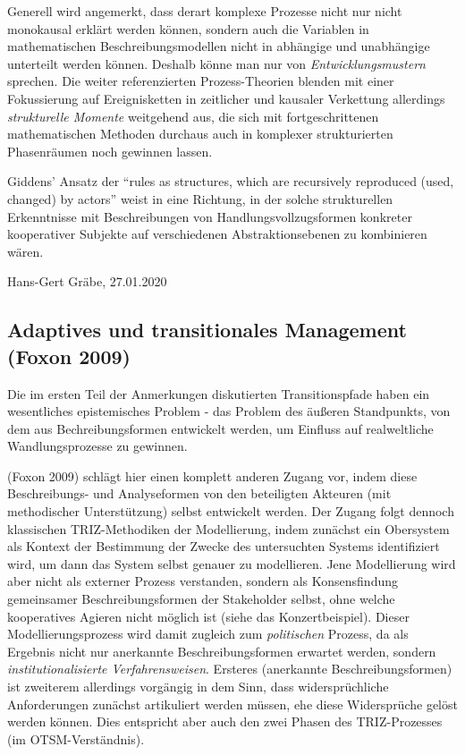 \documentclass[11pt,a4paper]{article}
\begin{document}
Generell wird angemerkt, dass derart komplexe Prozesse nicht nur nicht
monokausal erklärt werden können, sondern auch die Variablen in
mathematischen Beschreibungsmodellen nicht in abhängige und unabhängige
unterteilt werden können. Deshalb könne man nur von
\emph{Entwicklungsmustern} sprechen. Die weiter referenzierten
Prozess-Theorien blenden mit einer Fokussierung auf Ereignisketten in
zeitlicher und kausaler Verkettung allerdings \emph{strukturelle
Momente} weitgehend aus, die sich mit fortgeschrittenen mathematischen
Methoden durchaus auch in komplexer strukturierten Phasenräumen noch
gewinnen lassen.

Giddens' Ansatz der ``rules as structures, which are recursively
reproduced (used, changed) by actors'' weist in eine Richtung, in der
solche strukturellen Erkenntnisse mit Beschreibungen von
Handlungsvollzugsformen konkreter kooperativer Subjekte auf
verschiedenen Abstraktionsebenen zu kombinieren wären.

Hans-Gert Gräbe, 27.01.2020

\hypertarget{adaptives-und-transitionales-management-foxon-2009}{%
\subsection{Adaptives und transitionales Management (Foxon
2009)}\label{adaptives-und-transitionales-management-foxon-2009}}

Die im ersten Teil der Anmerkungen diskutierten Transitionspfade haben
ein wesentliches epistemisches Problem - das Problem des äußeren
Standpunkts, von dem aus Bechreibungsformen entwickelt werden, um
Einfluss auf realweltliche Wandlungsprozesse zu gewinnen.

(Foxon 2009) schlägt hier einen komplett anderen Zugang vor, indem diese
Beschreibungs- und Analyseformen von den beteiligten Akteuren (mit
methodischer Unterstützung) selbst entwickelt werden. Der Zugang folgt
dennoch klassischen TRIZ-Methodiken der Modellierung, indem zunächst ein
Obersystem als Kontext der Bestimmung der Zwecke des untersuchten
Systems identifiziert wird, um dann das System selbst genauer zu
modellieren. Jene Modellierung wird aber nicht als externer Prozess
verstanden, sondern als Konsensfindung gemeinsamer Beschreibungsformen
der Stakeholder selbst, ohne welche kooperatives Agieren nicht möglich
ist (siehe das Konzertbeispiel). Dieser Modellierungsprozess wird damit
zugleich zum \emph{politischen} Prozess, da als Ergebnis nicht nur
anerkannte Beschreibungsformen erwartet werden, sondern
\emph{institutionalisierte Verfahrensweisen}. Ersteres (anerkannte
Beschreibungsformen) ist zweiterem allerdings vorgängig in dem Sinn,
dass widersprüchliche Anforderungen zunächst artikuliert werden müssen,
ehe diese Widersprüche gelöst werden können. Dies entspricht aber auch
den zwei Phasen des TRIZ-Prozesses (im OTSM-Verständnis).
\end{document}
